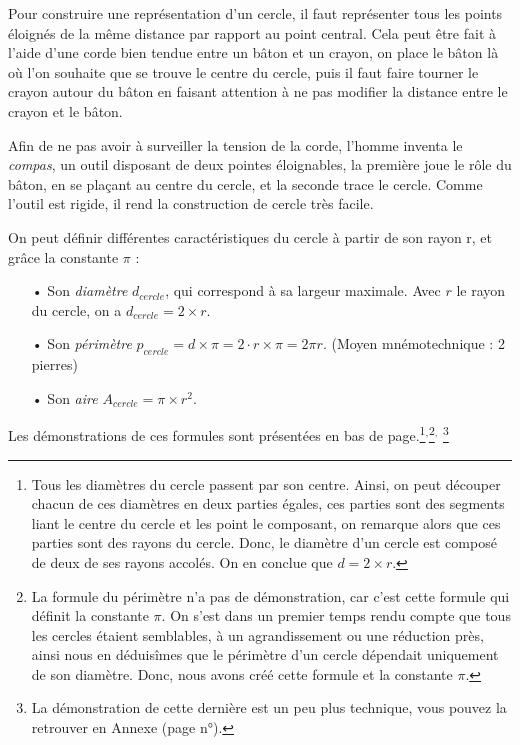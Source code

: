 \documentclass[a4paper, twoside]{article}
\begin{document}
Pour construire une représentation d'un cercle,
il faut représenter tous les points éloignés de la même distance par rapport au point central.
Cela peut être fait à l'aide d'une corde bien tendue entre un bâton et un crayon,
on place le bâton là où l'on souhaite que se trouve le centre du cercle,
puis il faut faire tourner le crayon autour du bâton en faisant attention à ne pas modifier
la distance entre le crayon et le bâton.

Afin de ne pas avoir à surveiller la tension de la corde, l'homme inventa le \emph{compas},
un outil disposant de deux pointes éloignables, la première joue le rôle du bâton,
en se plaçant au centre du cercle, et la seconde trace le cercle.
Comme l'outil est rigide, il rend la construction de cercle très facile.

\medbreak

On peut définir différentes caractéristiques du cercle à partir de son rayon r,
et grâce la constante $\pi$ :

\medbreak

\begin{itemize}
	\item[•] Son \emph{diamètre} $d_{cercle}$, qui correspond à sa largeur maximale.
	      Avec $r$ le rayon du cercle, on a $d_{cercle} = 2 \times r$.
	      \smallbreak
	\item[•] Son \emph{périmètre} $p_{cercle} = d \times \pi = 2 \cdot r \times \pi = 2 \pi r$. (Moyen mnémotechnique : 2 pierres)
	      \smallbreak
	\item[•] Son \emph{aire} $A_{cercle} = \pi \times r^2$.
\end{itemize}

\medbreak

Les démonstrations de ces formules sont présentées en bas de page.\footnote{Tous les diamètres du cercle passent par son centre.
	Ainsi, on peut découper chacun de ces diamètres en deux parties égales,
	ces parties sont des segments liant le centre du cercle et les point le composant,
	on remarque alors que ces parties sont des rayons du cercle.
	Donc, le diamètre d'un cercle est composé de deux de ses rayons accolés. On en conclue que $d = 2 \times r$.}$^{, }$\footnote{
	La formule du périmètre n'a pas de démonstration,
	car c'est cette formule qui définit la constante $\pi$.
	On s'est dans un premier temps rendu compte que tous les cercles étaient semblables,
	à un agrandissement ou une réduction près, ainsi nous en déduisîmes que le périmètre d'un cercle
	dépendait uniquement de son diamètre.
	Donc, nous avons créé cette
	formule et la constante
	$\pi$.}$^{, }$
\footnote{
	La démonstration de cette dernière est un peu plus technique,
	vous pouvez la retrouver en Annexe (page n°\pageref{demo_formule_aire_cercle}).}
\end{document}
